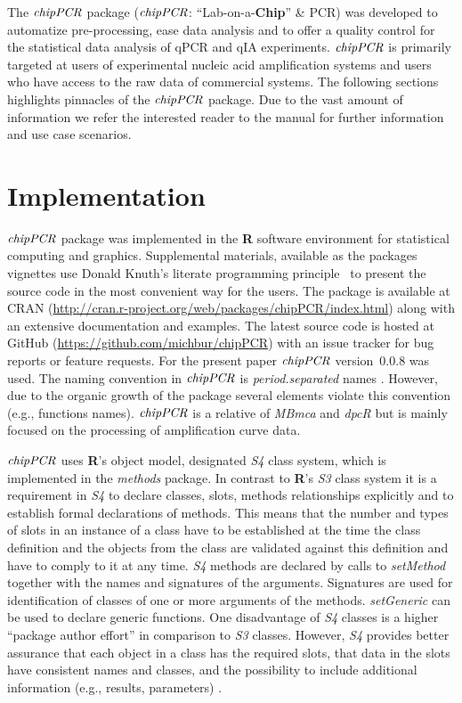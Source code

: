 \documentclass[twocolumn]{bmcart}%
\begin{document}
The $\emph{chipPCR}$ package ($\emph{chipPCR}$: ``Lab-on-a-\textbf{Chip}'' \& 
PCR) was developed to automatize pre-processing, ease data analysis and to offer 
a quality control for the statistical data analysis of qPCR and qIA 
experiments. $\emph{chipPCR}$ is primarily targeted at users of experimental 
nucleic acid amplification systems and users who have access to the raw data of 
commercial systems. The following sections highlights pinnacles of the 
$\emph{chipPCR}$ package. Due to the vast amount of information we refer the 
interested reader to the manual for further information and use case scenarios.

\section*{Implementation}

$\emph{chipPCR}$ package was implemented in the \textbf{R} software environment 
for statistical computing and graphics. Supplemental materials, available as the 
packages vignettes use Donald Knuth's literate programming 
principle~\cite{Knuth1984} to present the source code in the most convenient way 
for the users. The package is available at CRAN 
(\url{http://cran.r-project.org/web/packages/chipPCR/index.html}) along with an 
extensive documentation and examples. The latest source code is hosted at GitHub 
(\url{https://github.com/michbur/chipPCR}) with an issue tracker for bug reports 
or feature requests. For the present paper $\emph{chipPCR}$ version~0.0.8 was 
used. The naming convention in $\emph{chipPCR}$ is \textit{period.separated} 
names \cite{Baaaath_2012}. However, due to the organic growth of the package  
several elements violate this convention (e.g., functions names). 
$\emph{chipPCR}$ is a relative of \emph{MBmca} \cite{roediger_RJ_2013} and 
\emph{dpcR} but is mainly focused on the processing of amplification curve data.

  $\emph{chipPCR}$ uses \textbf{R}’s object model, designated \emph{S4} class 
system, which is implemented in the \emph{methods} package. In contrast to 
\textbf{R}’s \emph{S3} class system it is a requirement in \emph{S4} to declare 
classes, slots, methods relationships explicitly and to establish formal 
declarations of methods. This means that the number and types of slots in an 
instance of a class have to be established at the time the class definition and 
the objects from the class are validated against this definition and have to 
comply to it at any time. \emph{S4} methods are declared by calls to 
\textsl{setMethod} together with the names and signatures of the arguments. 
Signatures are used for identification of classes of one or more arguments of 
the methods. \textsl{setGeneric} can be used to declare generic functions. One 
disadvantage of \emph{S4} classes is a higher ``package author effort'' in 
comparison to \emph{S3} classes. However, \emph{S4} provides better assurance 
that each object in a class has the required slots, that data in the slots have 
consistent names and classes, and the possibility to include additional 
information (e.g., results, parameters) \cite{Karatzoglou_2004}.
\end{document}

